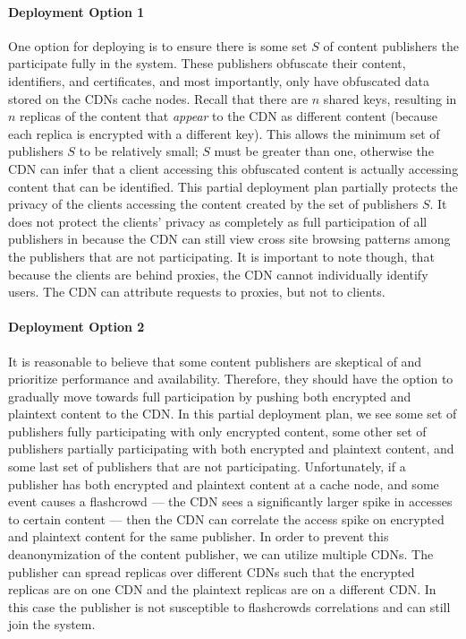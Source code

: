 \paragraph{Deployment Option 1}
One option for deploying \system{} is to ensure there is some set $S$ of content publishers the participate fully in the 
system.  These publishers obfuscate their content, identifiers, and certificates, and most importantly, only have 
obfuscated data stored on the CDNs cache nodes.  Recall that there are $n$ shared keys, resulting in $n$ replicas of the 
content that {\it appear} to the CDN as different content (because each replica is encrypted with a different key).  This 
allows the minimum set of publishers $S$ to be relatively small; $S$ must be greater than one, otherwise the CDN can infer 
that a client accessing this obfuscated content is actually accessing content that can be identified.  This partial deployment plan 
partially protects the privacy of the clients accessing the content created by the set of publishers $S$.  It does not 
protect the clients' privacy as completely as full participation of all publishers in \system{} because the CDN can 
still view cross site browsing patterns among the publishers that are not participating. It is important to note though, that 
because the clients are behind proxies, the CDN cannot individually identify users.  The CDN can attribute requests to proxies, but 
not to clients.  

\paragraph{Deployment Option 2} 
It is reasonable to believe that some content publishers are skeptical of \system{} and prioritize performance 
and availability.  Therefore, they should have the option to gradually move towards full participation by pushing 
both encrypted and plaintext content to the CDN.  In this partial deployment plan, we see some set of publishers 
fully participating with only encrypted content, some other set of publishers partially participating with both 
encrypted and plaintext content, and some last set of publishers that are not participating.  Unfortunately, if 
a publisher has both encrypted and plaintext content at a cache node, and some event causes a flashcrowd --- 
the CDN sees a significantly larger spike in accesses to certain content --- then the CDN can correlate the access 
spike on encrypted and plaintext content for the same publisher.  In order to prevent this deanonymization of the 
content publisher, we can utilize multiple CDNs.  The publisher can spread replicas over different CDNs such that 
the encrypted replicas are on one CDN and the plaintext replicas are on a different CDN.  In this case the publisher 
is not susceptible to flashcrowds correlations and can still join the system.


